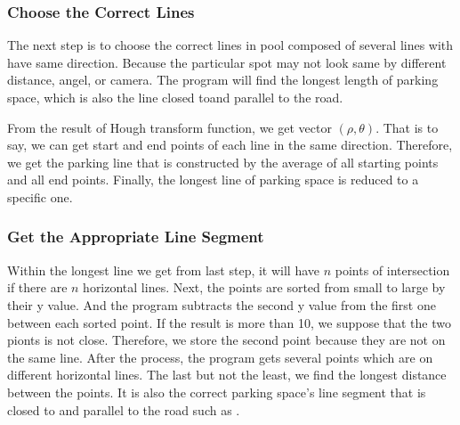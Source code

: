 \documentclass[runningheads,a4paper]{llncs}
\begin{document}
\subsubsection{Choose the Correct Lines}

The next step is to choose the correct lines in pool composed of
several lines with have same direction. Because the particular spot
may not look same by different distance, angel, or camera.
The program will find the longest length of parking space, which is
also the line closed toand parallel to the road.

From the result of Hough transform function, we get vector $(\rho, \theta)$.
That is to say, we can get start and end points of each line in the same direction.
Therefore, we get the parking line that is constructed by the
average of all starting points and all end points.
Finally, the longest line of parking space is reduced to a specific one.

\subsubsection{Get the Appropriate Line Segment}

Within the longest line we get from last step, it will have $n$ points of
intersection if there are $n$ horizontal lines. Next, the points are
sorted from small to large by their y value. And the program subtracts
the second y value from the first one between each sorted point. If the
result is more than 10, we suppose that the two pionts is not close.
Therefore, we store the second point because they are not on the same line.
After the process, the program gets several points which are on
different horizontal lines. The last but not the least, we find the longest
distance between the points. It is also the correct parking space's line
segment that is closed to and parallel to the road such as .
\end{document}
